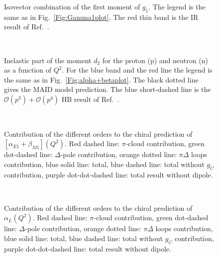 \documentclass[prc,twocolumn,showpacs,preprintnumbers,amsmath,amssymb
,superscriptaddress,a4paper,nofootinbib
]{revtex4-1}
\begin{document}
\begin{figure}
\begin{center}
\hspace{-0.3cm} 
\caption{Isovector combination of the first moment of $g_1$. The legend is the same as in Fig.~\ref{Fig:Gamma1plot}. The red thin band is the IR result of Ref.~\cite{Bernard:2002pw}. \label{Fig:Gamma1-isovector-plot}}
\end{center}
\end{figure}


\begin{figure}
\begin{center}
\hspace{-0.3cm} \\
\hspace{-0.3cm} 
\caption{Inelastic part of the moment $d_2$ for the proton (p) and neutron (n) as a function of $Q^2$. For the blue band and the red line the legend is the same as in Fig.~\ref{Fig:alpha+betaplot}. The black dotted line gives the MAID model prediction. The blue short-dashed line is the $\mathcal{O}(p^3)+\mathcal{O}(p^4)$ HB result of Ref.~\cite{Kao:2002cp,Kao:2003jd}.}
\end{center}
\end{figure}


\begin{figure}[H]
\begin{center}
\hspace{-0.3cm}\\ \hspace{-0.3cm} 
\caption{\small{Contribution of the different orders to the chiral prediction of $[\alpha_{E1}+\beta_{M1}](Q^2)$. Red dashed line: $\pi$-cloud contribution, green dot-dashed line: $\Delta$-pole contribution, orange dotted line: $\pi \Delta$ loops contribution, blue solid line: total, blue dashed line: total without $g_C$ contribution, purple dot-dot-dashed line: total result without dipole.}\label{Fig:alpha+beta-orders}}
\end{center}
\end{figure}

\begin{figure}[H]
\begin{center}
\hspace{-0.3cm}\\ \hspace{-0.3cm} 
\caption{Contribution of the different orders to the chiral prediction of $\alpha_{L}(Q^2)$. Red dashed line: $\pi$-cloud contribution, green dot-dashed line: $\Delta$-pole contribution, orange dotted line: $\pi \Delta$ loops contribution, blue solid line: total, blue dashed line: total without $g_C$ contribution, purple dot-dot-dashed line: total result without dipole. \label{Fig:alphaL-orders}}
\end{center}
\end{figure}
\end{document}

